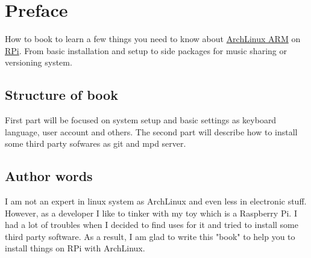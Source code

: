 \chapter*{Preface}
How to book to learn a few things you need to know about \href{http://archlinuxarm.org/platforms/armv6/raspberry-pi}{ArchLinux ARM} on \href{http://www.raspberrypi.org/help/what-is-a-raspberry-pi/}{RPi}. From basic installation and setup to side packages for music sharing or versioning system.

\section*{Structure of book}
First part will be focused on system setup and basic settings as keyboard language, user account and others. The second part will describe how to install some third party sofwares as git and mpd server.

\section*{Author words}
I am not an expert in linux system as ArchLinux and even less in electronic stuff. However, as a developer I like to tinker with my toy which is a Raspberry Pi. I had a lot of troubles when I decided to find uses for it and tried to install some third party software. As a result, I am glad to write this "book" to help you to install things on RPi with ArchLinux.
